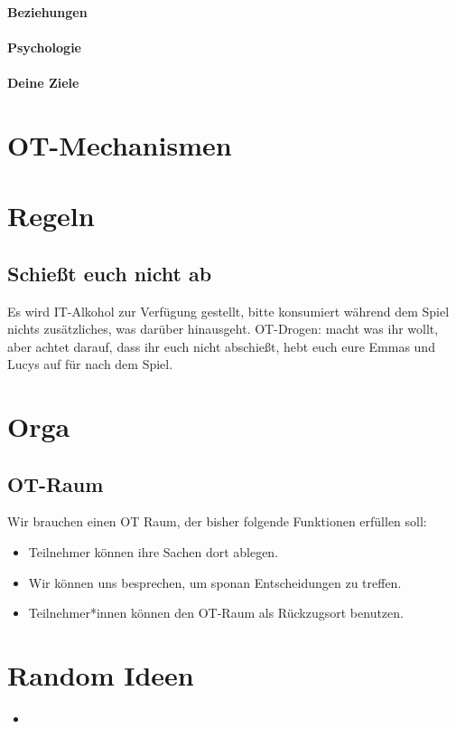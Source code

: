 \documentclass[12pt, a4paper, openany]{report}
\begin{document}
\subsubsection{Beziehungen}
\subsubsection{Psychologie}
\subsubsection{Deine Ziele}


\chapter{OT-Mechanismen}

\chapter{Regeln}
\section{Schießt euch nicht ab}
Es wird IT-Alkohol zur Verfügung gestellt, bitte konsumiert während dem Spiel nichts zusätzliches, was darüber hinausgeht.
OT-Drogen: macht was ihr wollt, aber achtet darauf, dass ihr euch nicht abschießt, hebt euch eure Emmas und Lucys auf für nach dem Spiel.

\chapter{Orga}

\section{OT-Raum}
Wir brauchen einen OT Raum, der bisher folgende Funktionen erfüllen soll:
\begin{itemize}
    \item Teilnehmer können ihre Sachen dort ablegen.
    \item Wir können uns besprechen, um sponan Entscheidungen zu treffen.
    \item Teilnehmer*innen können den OT-Raum als Rückzugsort benutzen. 
\end{itemize}

\chapter{Random Ideen}
\begin{itemize}
    \item 
\end{itemize}
\end{document}
